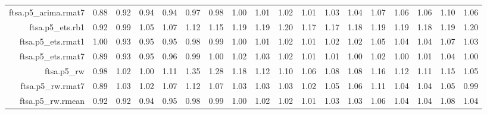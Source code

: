 \begin{tabular}{rrrrrrrrrrrrrrrrrr}
  ftsa.p5\_arima.rmat7 & 0.88 & 0.92 & 0.94 & 0.94 & 0.97 & 0.98 & 1.00 & 1.01 & 1.02 & 1.01 & 1.03 & 1.04 & 1.07 & 1.06 & 1.06 & 1.10 & 1.06 \\ 
  ftsa.p5\_ets.rb1 & 0.92 & 0.99 & 1.05 & 1.07 & 1.12 & 1.15 & 1.19 & 1.19 & 1.20 & 1.17 & 1.17 & 1.18 & 1.19 & 1.19 & 1.18 & 1.19 & 1.20 \\ 
  ftsa.p5\_ets.rmat1 & 1.00 & 0.93 & 0.95 & 0.95 & 0.98 & 0.99 & 1.00 & 1.01 & 1.02 & 1.01 & 1.02 & 1.02 & 1.05 & 1.04 & 1.04 & 1.07 & 1.03 \\ 
  ftsa.p5\_ets.rmat7 & 0.89 & 0.93 & 0.95 & 0.96 & 0.99 & 1.00 & 1.02 & 1.03 & 1.02 & 1.01 & 1.01 & 1.00 & 1.02 & 1.00 & 1.01 & 1.04 & 1.00 \\ 
  ftsa.p5\_rw & 0.98 & 1.02 & 1.00 & 1.11 & 1.35 & 1.28 & 1.18 & 1.12 & 1.10 & 1.06 & 1.08 & 1.08 & 1.16 & 1.12 & 1.11 & 1.15 & 1.05 \\ 
  ftsa.p5\_rw.rmat7 & 0.89 & 1.03 & 1.02 & 1.07 & 1.12 & 1.07 & 1.03 & 1.03 & 1.03 & 1.02 & 1.05 & 1.06 & 1.11 & 1.04 & 1.04 & 1.05 & 0.99 \\ 
  ftsa.p5\_rw.rmean & 0.92 & 0.92 & 0.94 & 0.95 & 0.98 & 0.99 & 1.00 & 1.02 & 1.02 & 1.01 & 1.03 & 1.03 & 1.06 & 1.04 & 1.04 & 1.08 & 1.04 \\ 
   \hline
\end{tabular}
